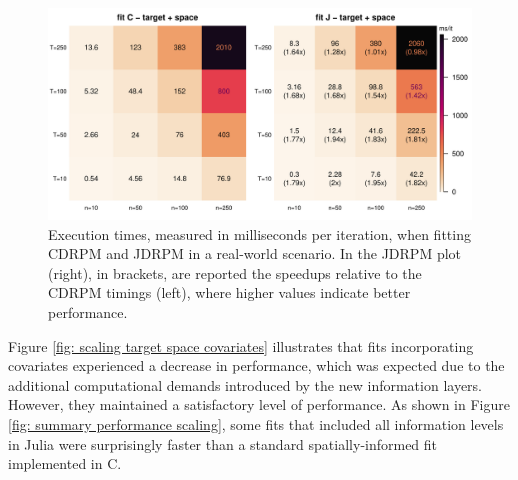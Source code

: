 \documentclass[12pt,	%
	a4paper,		%
	twoside,		%
	openright,		%
	titlepage,%
	]{book}
\theoremstyle{definition}
\begin{document}

\begin{figure}[!ht]
    \centering
    \includegraphics[width=1\linewidth]{Testing/Scaling possibilities/target_space.pdf}
    \caption[Execution times of CDRPM and JDRPM, real-world scenario]{Execution times, measured in milliseconds per iteration, when fitting CDRPM and JDRPM in a real-world scenario. In the JDRPM plot (right), in brackets, are reported the speedups relative to the CDRPM timings (left), where higher values indicate better performance.}
    \label{fig: scaling target space}
\end{figure}

Figure \ref{fig: scaling target space covariates} illustrates that fits incorporating covariates experienced a decrease in performance, which was expected due to the additional computational demands introduced by the new information layers. However, they maintained a satisfactory level of performance. As shown in Figure \ref{fig: summary performance scaling}, some fits that included all information levels in Julia were surprisingly faster than a standard spatially-informed fit implemented in C.
\end{document}
